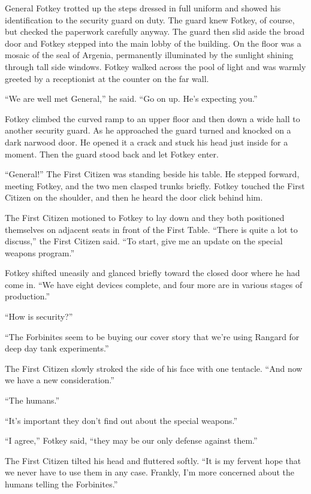 General Fotkey trotted up the steps dressed in full uniform and showed his identification to the
security guard on duty. The guard knew Fotkey, of course, but checked the paperwork carefully
anyway. The guard then slid aside the broad door and Fotkey stepped into the main lobby of the
building. On the floor was a mosaic of the seal of Argenia, permanently illuminated by the
sunlight shining through tall side windows. Fotkey walked across the pool of light and was
warmly greeted by a receptionist at the counter on the far wall.

``We are well met General,'' he said. ``Go on up. He's expecting you.''

Fotkey climbed the curved ramp to an upper floor and then down a wide hall to another security
guard. As he approached the guard turned and knocked on a dark narwood door. He opened it a
crack and stuck his head just inside for a moment. Then the guard stood back and let Fotkey
enter.

``General!'' The First Citizen was standing beside his table. He stepped forward, meeting
Fotkey, and the two men clasped trunks briefly. Fotkey touched the First Citizen on the
shoulder, and then he heard the door click behind him.


The First Citizen motioned to Fotkey to lay down and they both positioned themselves on adjacent
seats in front of the First Table. ``There is quite a lot to discuss,'' the First Citizen said.
``To start, give me an update on the special weapons program.''

Fotkey shifted uneasily and glanced briefly toward the closed door where he had come in. ``We
have eight devices complete, and four more are in various stages of production.''

``How is security?''

``The Forbinites seem to be buying our cover story that we're using Rangard for deep day tank
experiments.''

The First Citizen slowly stroked the side of his face with one tentacle. ``And now we have a new
consideration.''

``The humans.''

``It's important they don't find out about the special weapons.''

``I agree,'' Fotkey said, ``they may be our only defense against them.''

The First Citizen tilted his head and fluttered softly. ``It is my fervent hope that we never
have to use them in any case. Frankly, I'm more concerned about the humans telling the
Forbinites.''

